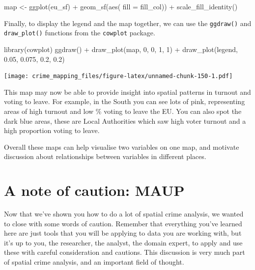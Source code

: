 \documentclass[
]{book}
\newenvironment{Shaded}{\begin{snugshade}}{\end{snugshade}}
\newcommand{\AttributeTok}[1]{\textcolor[rgb]{0.77,0.63,0.00}{#1}}
\newcommand{\DecValTok}[1]{\textcolor[rgb]{0.00,0.00,0.81}{#1}}
\newcommand{\FloatTok}[1]{\textcolor[rgb]{0.00,0.00,0.81}{#1}}
\newcommand{\FunctionTok}[1]{\textcolor[rgb]{0.00,0.00,0.00}{#1}}
\newcommand{\NormalTok}[1]{#1}
\newcommand{\OtherTok}[1]{\textcolor[rgb]{0.56,0.35,0.01}{#1}}
\newcommand{\SpecialCharTok}[1]{\textcolor[rgb]{0.00,0.00,0.00}{#1}}
\begin{document}
\begin{Shaded}
\begin{Highlighting}[]
\NormalTok{map }\OtherTok{\textless{}{-}} \FunctionTok{ggplot}\NormalTok{(eu\_sf) }\SpecialCharTok{+}
  \FunctionTok{geom\_sf}\NormalTok{(}\FunctionTok{aes}\NormalTok{( }\AttributeTok{fill =}\NormalTok{ fill\_col)) }\SpecialCharTok{+}
  \FunctionTok{scale\_fill\_identity}\NormalTok{() }
\end{Highlighting}
\end{Shaded}

Finally, to display the legend and the map together, we can use the \texttt{ggdraw()} and \texttt{draw\_plot()} functions from the \texttt{cowplot} package.

\begin{Shaded}
\begin{Highlighting}[]
\FunctionTok{library}\NormalTok{(cowplot)}
\FunctionTok{ggdraw}\NormalTok{() }\SpecialCharTok{+}
  \FunctionTok{draw\_plot}\NormalTok{(map, }\DecValTok{0}\NormalTok{, }\DecValTok{0}\NormalTok{, }\DecValTok{1}\NormalTok{, }\DecValTok{1}\NormalTok{) }\SpecialCharTok{+}
  \FunctionTok{draw\_plot}\NormalTok{(legend, }\FloatTok{0.05}\NormalTok{, }\FloatTok{0.075}\NormalTok{, }\FloatTok{0.2}\NormalTok{, }\FloatTok{0.2}\NormalTok{)}
\end{Highlighting}
\end{Shaded}

\texttt{[image: crime\_mapping\_files/figure-latex/unnamed-chunk-150-1.pdf]}

This map may now be able to provide insight into spatial patterns in turnout and voting to leave. For example, in the South you can see lots of pink, representing areas of high turnout and low \% voting to leave the EU. You can also spot the dark blue areas, these are Local Authorities which saw high voter turnout and a high proportion voting to leave.

Overall these maps can help visualise two variables on one map, and motivate discussion about relationships between variables in different places.

\hypertarget{a-note-of-caution-maup}{%
\section{A note of caution: MAUP}\label{a-note-of-caution-maup}}

Now that we've shown you how to do a lot of spatial crime analysis, we wanted to close with some words of caution. Remember that everything you've learned here are just tools that you will be applying to data you are working with, but it's up to you, the researcher, the analyst, the domain expert, to apply and use these with careful consideration and cautions. This discussion is very much part of spatial crime analysis, and an important field of thought.
\end{document}
